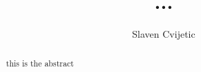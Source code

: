 \documentclass[11pt,a4paper,twosided]{article}
\begin{document}
	\author{Slaven Cvijetic}
	\title{...}
	\maketitle
	
	\begin{abstract}
		this is the abstract
	\end{abstract}
	
	
\end{document}
